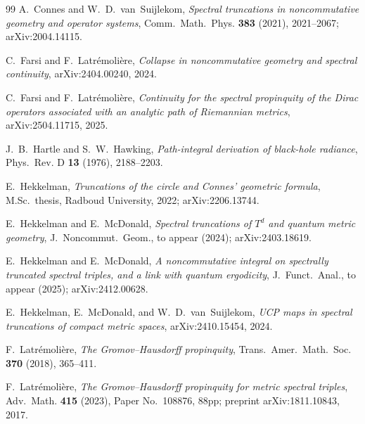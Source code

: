 \documentclass[11pt,a4paper]{article}
\theoremstyle{plain}
\theoremstyle{definition}
\begin{document}
\begin{thebibliography}{99}
A.~Connes and W.~D.~van~Suijlekom,
\newblock \emph{Spectral truncations in noncommutative geometry and
operator systems},
\newblock Comm.~Math.~Phys. \textbf{383} (2021), 2021--2067;
\newblock arXiv:2004.14115.

C.~Farsi and F.~Latr\'emoli\`ere,
\newblock \emph{Collapse in noncommutative geometry and spectral
continuity},
\newblock arXiv:2404.00240, 2024.

C.~Farsi and F.~Latr\'emoli\`ere,
\newblock \emph{Continuity for the spectral propinquity of the
Dirac operators associated with an analytic path of Riemannian
metrics},
\newblock arXiv:2504.11715, 2025.

J.~B.~Hartle and S.~W.~Hawking,
\newblock \emph{Path-integral derivation of black-hole radiance},
\newblock Phys.~Rev. D \textbf{13} (1976), 2188--2203.

E.~Hekkelman,
\newblock \emph{Truncations of the circle and Connes' geometric
formula},
\newblock M.Sc.\ thesis, Radboud University, 2022;
\newblock arXiv:2206.13744.

E.~Hekkelman and E.~McDonald,
\newblock \emph{Spectral truncations of $T^d$ and quantum metric
geometry},
\newblock J.~Noncommut.~Geom., to appear (2024);
\newblock arXiv:2403.18619.

E.~Hekkelman and E.~McDonald,
\newblock \emph{A noncommutative integral on spectrally truncated
spectral triples, and a link with quantum ergodicity},
\newblock J.~Funct.~Anal., to appear (2025);
\newblock arXiv:2412.00628.

E.~Hekkelman, E.~McDonald, and W.~D.~van~Suijlekom,
\newblock \emph{UCP maps in spectral truncations of compact metric
spaces},
\newblock arXiv:2410.15454, 2024.

F.~Latr\'emoli\`ere,
\newblock \emph{The Gromov--Hausdorff propinquity},
\newblock Trans.~Amer.~Math.~Soc. \textbf{370} (2018), 365--411.

F.~Latr\'emoli\`ere,
\newblock \emph{The Gromov--Hausdorff propinquity for metric spectral
triples},
\newblock Adv.~Math. \textbf{415} (2023), Paper No.~108876, 88pp;
\newblock preprint arXiv:1811.10843, 2017.


\end{thebibliography}
\end{document}
